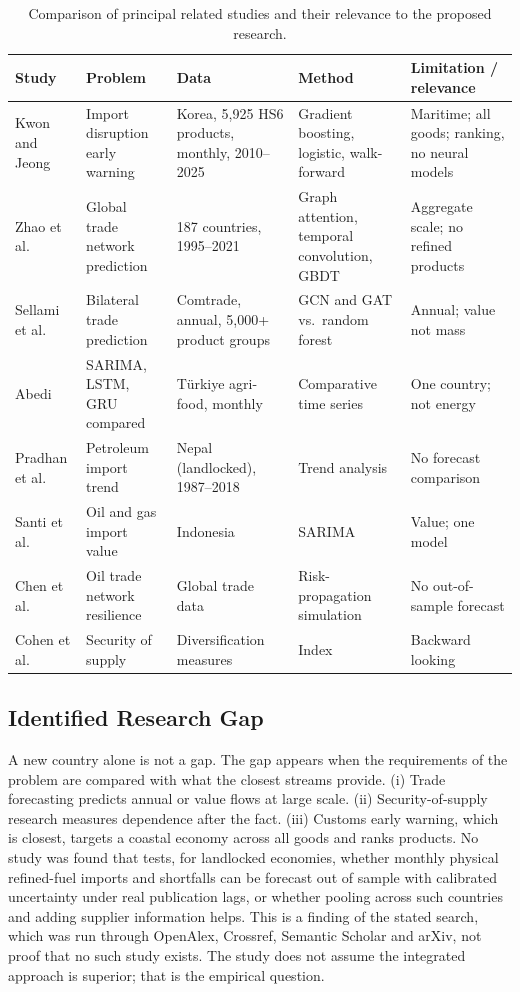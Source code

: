\documentclass[conference]{IEEEtran}
\begin{document}
\begin{table}[t]
\centering
\caption{Comparison of principal related studies and their relevance to the proposed research.}
\label{tab:related}
\small
\begin{tabularx}{\textwidth}{@{}L{2.2cm} L{3.1cm} X X X@{}}
\toprule
Study & Problem & Data & Method & Limitation / relevance\\
\midrule
Kwon and Jeong \cite{kwon2026} & Import disruption early warning & Korea, 5,925 HS6 products, monthly, 2010--2025 & Gradient boosting, logistic, walk-forward & Maritime; all goods; ranking, no neural models\\
Zhao et al. \cite{zhao2026} & Global trade network prediction & 187 countries, 1995--2021 & Graph attention, temporal convolution, GBDT & Aggregate scale; no refined products\\
Sellami et al. \cite{sellami2024} & Bilateral trade prediction & Comtrade, annual, 5,000+ product groups & GCN and GAT vs.\ random forest & Annual; value not mass\\
Abedi \cite{abedi2025} & SARIMA, LSTM, GRU compared & T\"urkiye agri-food, monthly & Comparative time series & One country; not energy\\
Pradhan et al. \cite{pradhan2023} & Petroleum import trend & Nepal (landlocked), 1987--2018 & Trend analysis & No forecast comparison\\
Santi et al. \cite{santi2023} & Oil and gas import value & Indonesia & SARIMA & Value; one model\\
Chen et al. \cite{chen2025} & Oil trade network resilience & Global trade data & Risk-propagation simulation & No out-of-sample forecast\\
Cohen et al. \cite{cohen2011} & Security of supply & Diversification measures & Index & Backward looking\\
\bottomrule
\end{tabularx}
\end{table}

\subsection{Identified Research Gap}\label{sec:gap}
A new country alone is not a gap. The gap appears when the requirements of the problem are compared with what the closest streams provide. (i) Trade forecasting predicts annual or value flows at large scale. (ii) Security-of-supply research measures dependence after the fact. (iii) Customs early warning, which is closest, targets a coastal economy across all goods and ranks products. No study was found that tests, for landlocked economies, whether monthly physical refined-fuel imports and shortfalls can be forecast out of sample with calibrated uncertainty under real publication lags, or whether pooling across such countries and adding supplier information helps. This is a finding of the stated search, which was run through OpenAlex, Crossref, Semantic Scholar and arXiv, not proof that no such study exists. The study does not assume the integrated approach is superior; that is the empirical question.
\end{document}
